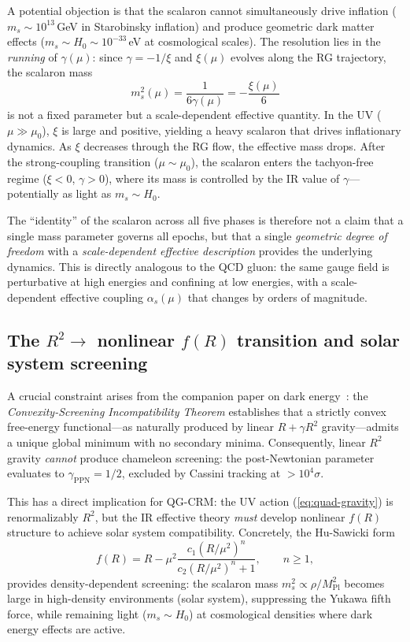 \documentclass[aps,prd,twocolumn,superscriptaddress,nofootinbib]{revtex4-2}
\begin{document}
A potential objection is that the scalaron cannot simultaneously drive inflation ($m_s \sim 10^{13}$\,GeV in Starobinsky inflation) and produce geometric dark matter effects ($m_s \sim H_0 \sim 10^{-33}$\,eV at cosmological scales). The resolution lies in the \textit{running} of $\gamma(\mu)$: since $\gamma = -1/\xi$ and $\xi(\mu)$ evolves along the RG trajectory, the scalaron mass
\begin{equation}
m_s^2(\mu) = \frac{1}{6\gamma(\mu)} = -\frac{\xi(\mu)}{6}
\label{eq:running-mass}
\end{equation}
is not a fixed parameter but a scale-dependent effective quantity. In the UV ($\mu \gg \mu_0$), $\xi$ is large and positive, yielding a heavy scalaron that drives inflationary dynamics. As $\xi$ decreases through the RG flow, the effective mass drops. After the strong-coupling transition ($\mu \sim \mu_0$), the scalaron enters the tachyon-free regime ($\xi < 0$, $\gamma > 0$), where its mass is controlled by the IR value of $\gamma$---potentially as light as $m_s \sim H_0$.

The ``identity'' of the scalaron across all five phases is therefore not a claim that a single mass parameter governs all epochs, but that a single \textit{geometric degree of freedom} with a \textit{scale-dependent effective description} provides the underlying dynamics. This is directly analogous to the QCD gluon: the same gauge field is perturbative at high energies and confining at low energies, with a scale-dependent effective coupling $\alpha_s(\mu)$ that changes by orders of magnitude.

\subsection{The $R^2 \to$ nonlinear $f(R)$ transition and solar system screening}
\label{sec:screening}

A crucial constraint arises from the companion paper on dark energy~\cite{GeigerDE2026}: the \textit{Convexity-Screening Incompatibility Theorem} establishes that a strictly convex free-energy functional---as naturally produced by linear $R + \gamma R^2$ gravity---admits a unique global minimum with no secondary minima. Consequently, linear $R^2$ gravity \textit{cannot} produce chameleon screening: the post-Newtonian parameter evaluates to $\gamma_\mathrm{PPN} = 1/2$, excluded by Cassini tracking at $>10^4\sigma$.

This has a direct implication for QG-CRM: the UV action (\ref{eq:quad-gravity}) is renormalizably $R^2$, but the IR effective theory \textit{must} develop nonlinear $f(R)$ structure to achieve solar system compatibility. Concretely, the Hu-Sawicki form~\cite{HuSawicki2007}
\begin{equation}
f(R) = R - \mu^2\frac{c_1(R/\mu^2)^n}{c_2(R/\mu^2)^n + 1}, \qquad n \geq 1,
\label{eq:hu-sawicki}
\end{equation}
provides density-dependent screening: the scalaron mass $m_s^2 \propto \rho/M_\mathrm{Pl}^2$ becomes large in high-density environments (solar system), suppressing the Yukawa fifth force, while remaining light ($m_s \sim H_0$) at cosmological densities where dark energy effects are active.
\end{document}
